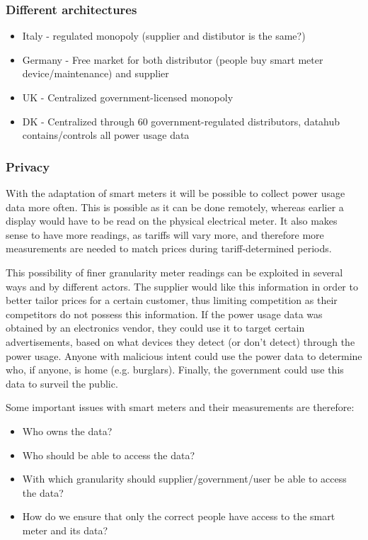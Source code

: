 \subsubsection{Different architectures}
\begin{itemize}
	\item Italy - regulated monopoly (supplier and distibutor is the same?)
	\item Germany - Free market for both distributor (people buy smart meter device/maintenance) and supplier
	\item UK - Centralized government-licensed monopoly
	\item DK - Centralized through 60 government-regulated distributors, datahub contains/controls all power usage data
\end{itemize}

\subsubsection{Privacy}
With the adaptation of smart meters it will be possible to collect power usage data more often.
This is possible as it can be done remotely, whereas earlier a display would have to be read on the physical electrical meter.
It also makes sense to have more readings, as tariffs will vary more, and therefore more measurements are needed to match prices during tariff-determined periods.

This possibility of finer granularity meter readings can be exploited in several ways and by different actors.
The supplier would like this information in order to better tailor prices for a certain customer, thus limiting competition as their competitors do not possess this information.
If the power usage data was obtained by an electronics vendor, they could use it to target certain advertisements, based on what devices they detect (or don't detect) through the power usage.
Anyone with malicious intent could use the power data to determine who, if anyone, is home (e.g. burglars).
Finally, the government could use this data to surveil the public.

Some important issues with smart meters and their measurements are therefore:
\begin{itemize}
	\item Who owns the data?
	\item Who should be able to access the data?
	\item With which granularity should supplier/government/user be able to access the data?
	\item How do we ensure that only the correct people have access to the smart meter and its data?
\end{itemize}

